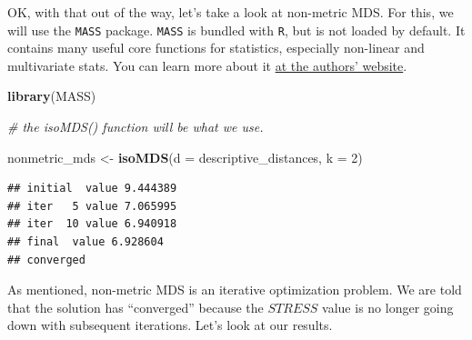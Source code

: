 \documentclass[
]{book}
\newenvironment{Shaded}{\begin{snugshade}}{\end{snugshade}}
\newcommand{\AttributeTok}[1]{\textcolor[rgb]{0.13,0.29,0.53}{#1}}
\newcommand{\CommentTok}[1]{\textcolor[rgb]{0.56,0.35,0.01}{\textit{#1}}}
\newcommand{\DecValTok}[1]{\textcolor[rgb]{0.00,0.00,0.81}{#1}}
\newcommand{\FunctionTok}[1]{\textcolor[rgb]{0.13,0.29,0.53}{\textbf{#1}}}
\newcommand{\NormalTok}[1]{#1}
\newcommand{\OtherTok}[1]{\textcolor[rgb]{0.56,0.35,0.01}{#1}}
\newcommand{\SpecialCharTok}[1]{\textcolor[rgb]{0.81,0.36,0.00}{\textbf{#1}}}
\newcommand{\StringTok}[1]{\textcolor[rgb]{0.31,0.60,0.02}{#1}}
\begin{document}
OK, with that out of the way, let's take a look at non-metric MDS. For this, we will use the \texttt{MASS} package. \texttt{MASS} is bundled with \texttt{R}, but is not loaded by default. It contains many useful core functions for statistics, especially non-linear and multivariate stats. You can learn more about it \href{https://www.stats.ox.ac.uk/pub/MASS4/}{at the authors' website}.

\begin{Shaded}
\begin{Highlighting}[]
\FunctionTok{library}\NormalTok{(MASS)}

\CommentTok{\# the \textasciigrave{}isoMDS()\textasciigrave{} function will be what we use.}

\NormalTok{nonmetric\_mds }\OtherTok{\textless{}{-}}
  \FunctionTok{isoMDS}\NormalTok{(}\AttributeTok{d =}\NormalTok{ descriptive\_distances, }\AttributeTok{k =} \DecValTok{2}\NormalTok{)}
\end{Highlighting}
\end{Shaded}

\begin{verbatim}
## initial  value 9.444389 
## iter   5 value 7.065995
## iter  10 value 6.940918
## final  value 6.928604 
## converged
\end{verbatim}

As mentioned, non-metric MDS is an iterative optimization problem. We are told that the solution has ``converged'' because the \(STRESS\) value is no longer going down with subsequent iterations. Let's look at our results.

\begin{Shaded}
\end{Shaded}
\end{document}
